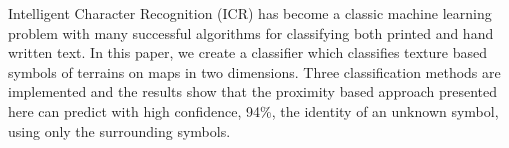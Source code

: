 
Intelligent Character Recognition (ICR) has become a classic machine learning
problem with many successful algorithms for classifying both printed and hand
written text. In this paper, we create a classifier which classifies
texture based symbols of terrains on maps in two dimensions. Three
classification methods are implemented and the results show that the proximity
based approach presented
here can predict with high confidence, 94\%, the identity of an unknown symbol,
using only the surrounding symbols.

